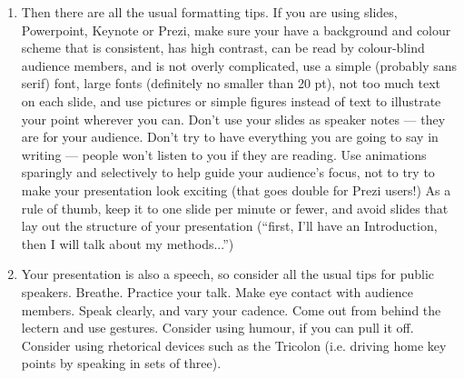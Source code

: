 \documentclass{beamer}
\begin{document}
\begin{frame}
\begin{enumerate}
\item Then there are all the usual formatting tips. If you are using slides, Powerpoint, Keynote or Prezi, make sure your have a background and colour scheme that is consistent, has high contrast, can be read by colour-blind audience members, and is not overly complicated, use a simple (probably sans serif) font, large fonts (definitely no smaller than 20 pt), not too much text on each slide, and use pictures or simple figures instead of text to illustrate your point wherever you can. Don’t use your slides as speaker notes — they are for your audience. Don’t try to have everything you are going to say in writing — people won’t listen to you if they are reading. Use animations sparingly and selectively to help guide your audience’s focus, not to try to make your presentation look exciting (that goes double for Prezi users!) As a rule of thumb, keep it to one slide per minute or fewer, and avoid slides that lay out the structure of your presentation (``first, I’ll have an Introduction, then I will talk about my methods...'')

\item Your presentation is also a speech, so consider all the usual tips for public speakers. Breathe. Practice your talk. Make eye contact with audience members. Speak clearly, and vary your cadence. Come out from behind the lectern and use gestures. Consider using humour, if you can pull it off. Consider using rhetorical devices such as the Tricolon (i.e. driving home key points by speaking in sets of three).

\end{enumerate}

\end{frame}
\end{document}
